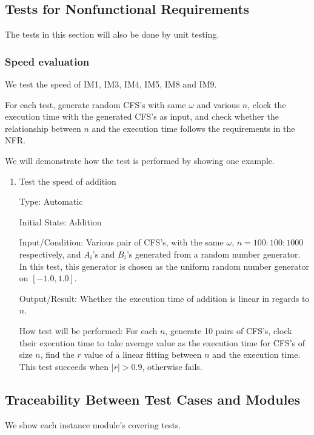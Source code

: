 \documentclass[12pt, titlepage]{article}
\begin{document}
\subsection{Tests for Nonfunctional Requirements}
The tests in this section will also be done by unit testing.

\subsubsection{Speed evaluation}
We test the speed of IM1, IM3, IM4, IM5, IM8 and IM9.	

For each test, generate random CFS's with same $\omega$ and various $n$, clock the execution time with the generated CFS's as input, and check whether the relationship between $n$ and the execution time follows the requirements in the NFR. 		

We will demonstrate how the test is performed by showing one example.
\begin{enumerate}
	
	\item{Test the speed of addition\\}
	
	Type: Automatic
	
	Initial State: Addition
	
	Input/Condition: Various pair of CFS's, with the same $\omega$, $n=100:100:1000$ respectively, and $A_i$'s and $B_i$'s generated from a random number generator. In this test, this generator is chosen as the uniform random number generator on $[-1.0, 1.0]$. 
	
	Output/Result: Whether the execution time of addition is linear in regards to $n$.
	
	How test will be performed: For each $n$, generate 10 pairs of CFS's, clock their execution time to take average value as the execution time for CFS's of size $n$, find the $r$ value of a linear fitting between $n$ and the execution time. This test succeeds when $|r|>0.9$, otherwise fails. 
	
\end{enumerate}

\subsection{Traceability Between Test Cases and Modules}
We show each instance module's covering tests.
\end{document}
